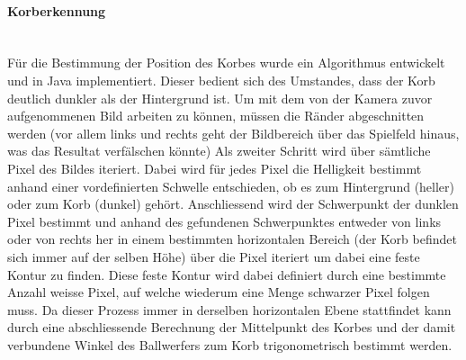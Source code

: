 	\paragraph{Korberkennung}$~~$\vspace{2mm}\\
		Für die Bestimmung der Position des Korbes wurde ein Algorithmus entwickelt und in Java implementiert. 
		Dieser bedient sich des Umstandes, dass der Korb deutlich dunkler als der Hintergrund ist. 
		Um mit dem von der Kamera zuvor aufgenommenen Bild arbeiten zu können, müssen die Ränder abgeschnitten werden 
		(vor allem links und rechts geht der Bildbereich über das Spielfeld hinaus, was das Resultat verfälschen könnte) 
		Als zweiter Schritt wird über sämtliche Pixel des Bildes iteriert. Dabei wird für jedes Pixel die Helligkeit bestimmt 
		anhand einer vordefinierten Schwelle entschieden, ob es zum Hintergrund (heller) oder zum Korb (dunkel) gehört. 
		Anschliessend wird der Schwerpunkt der dunklen Pixel bestimmt und anhand des gefundenen Schwerpunktes entweder
		von links oder von rechts her in einem bestimmten horizontalen Bereich (der Korb befindet sich immer auf der selben Höhe)
		über die Pixel iteriert um dabei eine feste Kontur zu finden. Diese feste Kontur wird dabei definiert durch eine
		bestimmte Anzahl weisse Pixel, auf welche wiederum eine Menge schwarzer Pixel folgen muss. 
		Da dieser Prozess immer in derselben horizontalen Ebene stattfindet kann durch eine abschliessende Berechnung 
		der Mittelpunkt des Korbes und der damit verbundene Winkel des Ballwerfers zum Korb trigonometrisch bestimmt werden.
